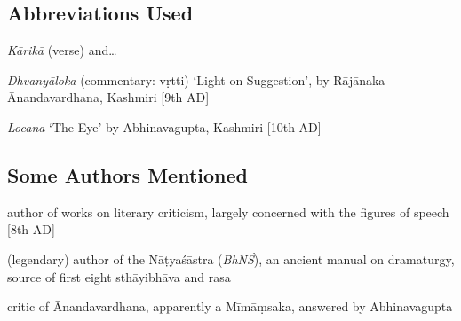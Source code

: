 \documentclass{article}
\begin{document}
\subsection{Abbreviations Used}

\begin{description}
	\setlength{\itemsep}{-0.2em}

	\item[K] \textit{Kārikā} (verse) and\dots
	\item[A] \textit{Dhvanyāloka} (commentary: vṛtti) `Light on Suggestion', by Rājānaka \\ Ānandavardhana, Kashmiri [9th AD]
	\item[L] \textit{Locana} `The Eye' by Abhinavagupta, Kashmiri [10th AD]
\end{description}


\subsection{Some Authors Mentioned}

\begin{description}
	\setlength{\itemsep}{-0.2em}

	\item[Bhāmaha] author of works on literary criticism, largely concerned with the figures of speech [8th AD]
	\item[Bharata] (legendary) author of the Nāṭyaśāstra (\textit{BhNŚ}), an ancient manual on dramaturgy, source of first eight sthāyibhāva and rasa
	\item[Bhattanayaka] critic of Ānandavardhana, apparently a Mīmāṃsaka, answered by Abhinavagupta
\end{description}
\end{document}
